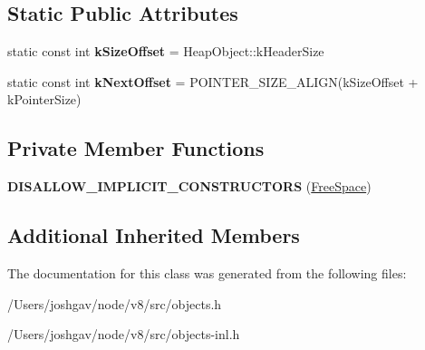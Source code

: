 \subsection*{Static Public Attributes}
\begin{DoxyCompactItemize}
\item 
static const int {\bfseries k\+Size\+Offset} = Heap\+Object\+::k\+Header\+Size\hypertarget{classv8_1_1internal_1_1_free_space_a7fd33f05c7a8d5417c28228c73f8608a}{}\label{classv8_1_1internal_1_1_free_space_a7fd33f05c7a8d5417c28228c73f8608a}

\item 
static const int {\bfseries k\+Next\+Offset} = P\+O\+I\+N\+T\+E\+R\+\_\+\+S\+I\+Z\+E\+\_\+\+A\+L\+I\+GN(k\+Size\+Offset + k\+Pointer\+Size)\hypertarget{classv8_1_1internal_1_1_free_space_a16df757f9e0a708e78211a0ba872eaae}{}\label{classv8_1_1internal_1_1_free_space_a16df757f9e0a708e78211a0ba872eaae}

\end{DoxyCompactItemize}
\subsection*{Private Member Functions}
\begin{DoxyCompactItemize}
\item 
{\bfseries D\+I\+S\+A\+L\+L\+O\+W\+\_\+\+I\+M\+P\+L\+I\+C\+I\+T\+\_\+\+C\+O\+N\+S\+T\+R\+U\+C\+T\+O\+RS} (\hyperlink{classv8_1_1internal_1_1_free_space}{Free\+Space})\hypertarget{classv8_1_1internal_1_1_free_space_a39d3f7b720a8e4ac5533a890af982c1d}{}\label{classv8_1_1internal_1_1_free_space_a39d3f7b720a8e4ac5533a890af982c1d}

\end{DoxyCompactItemize}
\subsection*{Additional Inherited Members}


The documentation for this class was generated from the following files\+:\begin{DoxyCompactItemize}
\item 
/\+Users/joshgav/node/v8/src/objects.\+h\item 
/\+Users/joshgav/node/v8/src/objects-\/inl.\+h\end{DoxyCompactItemize}
